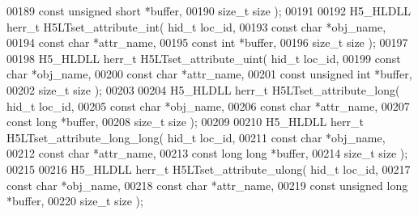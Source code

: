 \begin{DoxyCode}
00189                               \textcolor{keyword}{const} \textcolor{keywordtype}{unsigned} \textcolor{keywordtype}{short} *buffer,
00190                               \textcolor{keywordtype}{size\_t} size );
00191 
00192 H5\_HLDLL herr\_t  H5LTset\_attribute\_int( hid\_t loc\_id,
00193                               \textcolor{keyword}{const} \textcolor{keywordtype}{char} *obj\_name,
00194                               \textcolor{keyword}{const} \textcolor{keywordtype}{char} *attr\_name,
00195                               \textcolor{keyword}{const} \textcolor{keywordtype}{int} *buffer,
00196                               \textcolor{keywordtype}{size\_t} size );
00197 
00198 H5\_HLDLL herr\_t  H5LTset\_attribute\_uint( hid\_t loc\_id,
00199                               \textcolor{keyword}{const} \textcolor{keywordtype}{char} *obj\_name,
00200                               \textcolor{keyword}{const} \textcolor{keywordtype}{char} *attr\_name,
00201                               \textcolor{keyword}{const} \textcolor{keywordtype}{unsigned} \textcolor{keywordtype}{int} *buffer,
00202                               \textcolor{keywordtype}{size\_t} size );
00203 
00204 H5\_HLDLL herr\_t  H5LTset\_attribute\_long( hid\_t loc\_id,
00205                                \textcolor{keyword}{const} \textcolor{keywordtype}{char} *obj\_name,
00206                                \textcolor{keyword}{const} \textcolor{keywordtype}{char} *attr\_name,
00207                                \textcolor{keyword}{const} \textcolor{keywordtype}{long} *buffer,
00208                                \textcolor{keywordtype}{size\_t} size );
00209 
00210 H5\_HLDLL herr\_t  H5LTset\_attribute\_long\_long( hid\_t loc\_id,
00211                                \textcolor{keyword}{const} \textcolor{keywordtype}{char} *obj\_name,
00212                                \textcolor{keyword}{const} \textcolor{keywordtype}{char} *attr\_name,
00213                                \textcolor{keyword}{const} \textcolor{keywordtype}{long} \textcolor{keywordtype}{long} *buffer,
00214                                \textcolor{keywordtype}{size\_t} size );
00215 
00216 H5\_HLDLL herr\_t  H5LTset\_attribute\_ulong( hid\_t loc\_id,
00217                                \textcolor{keyword}{const} \textcolor{keywordtype}{char} *obj\_name,
00218                                \textcolor{keyword}{const} \textcolor{keywordtype}{char} *attr\_name,
00219                                \textcolor{keyword}{const} \textcolor{keywordtype}{unsigned} \textcolor{keywordtype}{long} *buffer,
00220                                \textcolor{keywordtype}{size\_t} size );

\end{DoxyCode}
